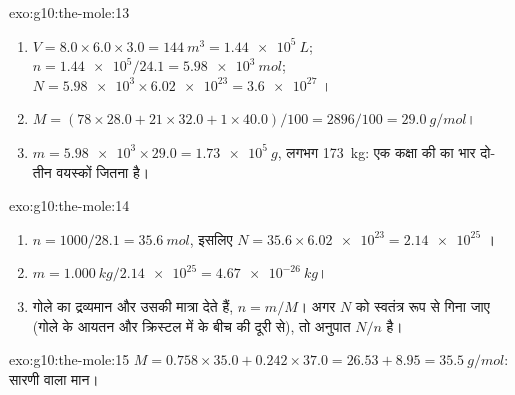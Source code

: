 \begin{solution}{exo:g10:the-mole:13}
\begin{enumerate}
  \item $V = 8.0 \times 6.0 \times 3.0 = \qty{144}{m^3} =
        \qty{1.44e5}{L}$; $n = \num{1.44e5} / 24.1 = \qty{5.98e3}{mol}$;
        $N = \num{5.98e3} \times \num{6.02e23} = \num{3.6e27}$ ।
  \item $M = (78 \times 28.0 + 21 \times 32.0 + 1 \times 40.0) / 100 =
        2896 / 100 = \qty{29.0}{g/mol}$।
  \item $m = \num{5.98e3} \times 29.0 = \qty{1.73e5}{g}$, लगभग
        \qty{173}{kg}: एक कक्षा की  का भार दो-तीन वयस्कों
        जितना है।
\end{enumerate}
\end{solution}

\begin{solution}{exo:g10:the-mole:14}
\begin{enumerate}
  \item $n = 1000 / 28.1 = \qty{35.6}{mol}$, इसलिए
        $N = 35.6 \times \num{6.02e23} = \num{2.14e25}$ ।
  \item $m = \qty{1.000}{kg} / \num{2.14e25} = \qty{4.67e-26}{kg}$।
  \item गोले का द्रव्यमान और  उसकी मात्रा देते हैं,
        $n = m / M$। अगर  $N$ को स्वतंत्र रूप से गिना जाए (गोले के
        आयतन और क्रिस्टल में  के बीच की दूरी से), तो अनुपात $N / n$
         है।
\end{enumerate}
\end{solution}

\begin{solution}{exo:g10:the-mole:15}
$M = 0.758 \times 35.0 + 0.242 \times 37.0 = 26.53 + 8.95 =
\qty{35.5}{g/mol}$: सारणी वाला मान।
\end{solution}

